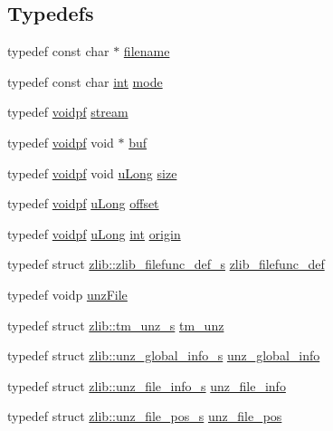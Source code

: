\subsection*{Typedefs}
\begin{DoxyCompactItemize}
\item 
typedef const char $\ast$ \hyperlink{namespacezlib_ac9e8acdeb11e8fa9e3f373572b6d4a9f}{filename}
\item 
typedef const char \hyperlink{namespacezlib_a0c9da18d93722fcf02a354ae2b6ec1ba}{int} \hyperlink{namespacezlib_a86cbc9a4e23f2f76a5589cb2e090ea6e}{mode}
\item 
typedef \hyperlink{namespacezlib_a2bc9778594c329ce309c43185bc3f9eb}{voidpf} \hyperlink{namespacezlib_a689061d38c26885a3b86df5f35c4d098}{stream}
\item 
typedef \hyperlink{namespacezlib_a2bc9778594c329ce309c43185bc3f9eb}{voidpf} void $\ast$ \hyperlink{namespacezlib_a500d53d2dafa1e8390dc41cc14dd5553}{buf}
\item 
typedef \hyperlink{namespacezlib_a2bc9778594c329ce309c43185bc3f9eb}{voidpf} void \hyperlink{namespacezlib_a3bc0123d9337acd75d286df79e6cf7da}{u\+Long} \hyperlink{namespacezlib_aec07beda6162c9849d5319f347c08aa7}{size}
\item 
typedef \hyperlink{namespacezlib_a2bc9778594c329ce309c43185bc3f9eb}{voidpf} \hyperlink{namespacezlib_a3bc0123d9337acd75d286df79e6cf7da}{u\+Long} \hyperlink{namespacezlib_a3cdfa90d3d1b7df7de1221e86160ba4b}{offset}
\item 
typedef \hyperlink{namespacezlib_a2bc9778594c329ce309c43185bc3f9eb}{voidpf} \hyperlink{namespacezlib_a3bc0123d9337acd75d286df79e6cf7da}{u\+Long} \hyperlink{namespacezlib_a0c9da18d93722fcf02a354ae2b6ec1ba}{int} \hyperlink{namespacezlib_af3bbffc0677fddd7d406578a9d026a94}{origin}
\item 
typedef struct \hyperlink{structzlib_1_1zlib__filefunc__def__s}{zlib\+::zlib\+\_\+filefunc\+\_\+def\+\_\+s} \hyperlink{namespacezlib_a4ada5a935fba7f21209bc451eb7ffbc7}{zlib\+\_\+filefunc\+\_\+def}
\item 
typedef voidp \hyperlink{namespacezlib_a48c1eb530e72d2132ea9cb6648f4047e}{unz\+File}
\item 
typedef struct \hyperlink{structzlib_1_1tm__unz__s}{zlib\+::tm\+\_\+unz\+\_\+s} \hyperlink{namespacezlib_a98fa3246f3d786aca4a6def1a4c380ab}{tm\+\_\+unz}
\item 
typedef struct \hyperlink{structzlib_1_1unz__global__info__s}{zlib\+::unz\+\_\+global\+\_\+info\+\_\+s} \hyperlink{namespacezlib_a720c995c51babbb6d5cbf3e022a4c7b4}{unz\+\_\+global\+\_\+info}
\item 
typedef struct \hyperlink{structzlib_1_1unz__file__info__s}{zlib\+::unz\+\_\+file\+\_\+info\+\_\+s} \hyperlink{namespacezlib_aaf9fc35879a68a5fe0b6a5113bd271b5}{unz\+\_\+file\+\_\+info}
\item 
typedef struct \hyperlink{structzlib_1_1unz__file__pos__s}{zlib\+::unz\+\_\+file\+\_\+pos\+\_\+s} \hyperlink{namespacezlib_aafe5edb16e400a11811c203048d2f464}{unz\+\_\+file\+\_\+pos}
\end{DoxyCompactItemize}

